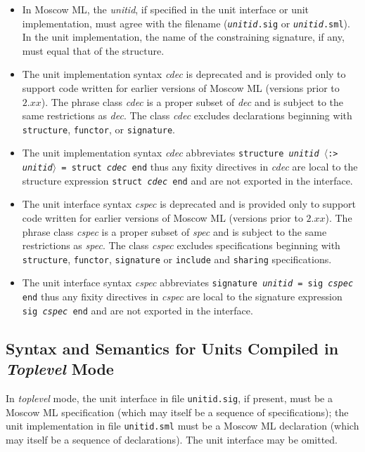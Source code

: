 \documentclass[fleqn]{article}
\newcommand{\la}{$\langle$}
\newcommand{\ra}{$\rangle$}
\begin{document}
\begin{itemize}
\item In Moscow ML, the {\it unitid}, if specified in the unit interface
  or unit implementation, must agree with the filename ({\tt {\it unitid}.sig} or
  {\tt {\it unitid}.sml}). 
  In the unit implementation, the name of the
  constraining signature, if any, must equal that of the structure.

\item The unit implementation syntax {\it cdec} is deprecated and is provided only 
to support code written for earlier versions of Moscow ML  (versions prior 
to $2.xx$). The phrase class
{\it cdec} is a proper subset of {\it dec} and is subject to the same restrictions as {\it dec}. The class {\it cdec} excludes
  declarations beginning with {\tt structure}, {\tt functor}, or
  {\tt signature}.

\item The unit implementation syntax {\it cdec}  abbreviates 
{\tt structure {\it unitid\/} \la:> {\it unitid\/}\ra\ = struct {\it cdec\/} end} 
thus any fixity directives in {\it cdec} are
local to the structure expression
{\tt struct {\it cdec\/} end} and are not exported in the interface.

\item The unit interface syntax {\it cspec} is deprecated and is provided only 
to support code written for earlier versions of Moscow ML  (versions prior 
to $2.xx$). The phrase class
{\it cspec} is a proper subset of {\it spec} and is subject to the same restrictions as {\it spec}. 
The class {\it cspec} excludes
specifications beginning with {\tt structure}, {\tt functor}, {\tt signature}  or {\tt include} and {\tt sharing} specifications.

\item The unit interface syntax {\it cspec}  abbreviates
 {\tt signature {\it unitid\/} = sig {\it cspec\/} end}
thus any fixity directives in {\it cspec} are local to the signature expression 
{\tt sig {\it cspec\/} end} 
and are not exported in the interface.

\end{itemize}

\subsection{Syntax and Semantics for Units Compiled in \emph{Toplevel} Mode}

In \emph{toplevel} mode, the unit interface in file {\tt unitid.sig}, if present,
must be a Moscow ML specification (which may itself be a sequence of specifications);
the unit implementation in file {\tt unitid.sml} must be a Moscow ML declaration (which may itself be
a sequence of declarations).
The unit interface may be omitted.
\end{document}
